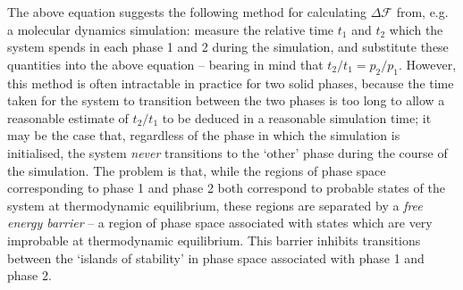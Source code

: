 \documentclass{report}
\begin{document}
The above equation suggests the following method for calculating $\Delta \mathcal{F}$ from, e.g. a molecular dynamics simulation: measure the 
relative time $t_1$ 
and $t_2$ which the system spends in each phase 1 and 2 during the simulation, and substitute these quantities into the above equation -- bearing in mind 
that $t_2/t_1=p_2/p_1$. However, this method is often intractable in practice for two solid phases, 
because the time taken for the system to transition between the two phases is too long to allow a reasonable estimate of $t_2/t_1$ to be deduced 
in a reasonable simulation time; it may be the case that, regardless of the phase in which the simulation is initialised, the system \emph{never} 
transitions to the `other' phase during the course of the simulation.
The problem is that, while the regions of phase space corresponding to phase 1 and phase 2 both correspond to probable states of the system
at thermodynamic equilibrium, these regions are separated by a \emph{free energy barrier} -- a region of phase space associated
with states which are very improbable at thermodynamic equilibrium. This barrier inhibits transitions between the `islands of
stability' in phase space associated with phase 1 and phase 2.
\end{document}
